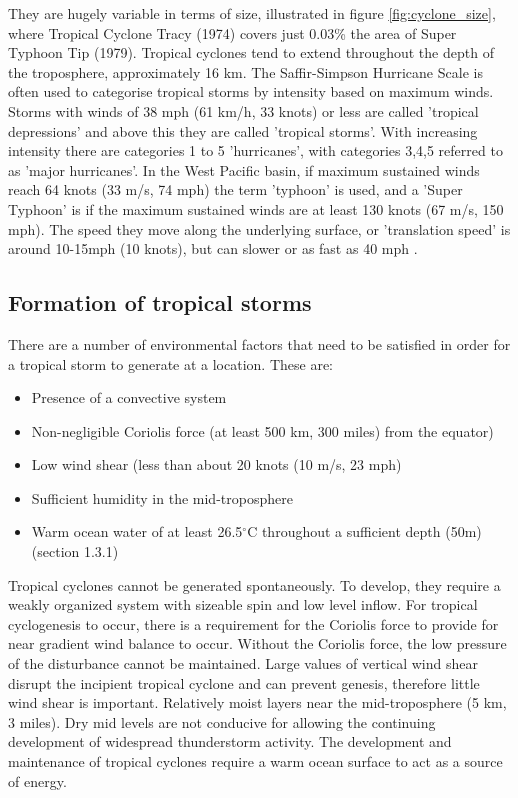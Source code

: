 They are hugely variable in terms of size, illustrated in figure \ref{fig:cyclone_size}, where Tropical Cyclone Tracy (1974) covers just 0.03\% the area of Super Typhoon Tip (1979). Tropical cyclones tend to extend throughout the depth of the troposphere, approximately 16 km. The Saffir-Simpson Hurricane Scale \citep{simpson1974hurricane} is often used to categorise tropical storms by intensity based on maximum winds. Storms with winds of 38 mph (61 km/h, 33 knots) or less are called 'tropical depressions' and above this they are called 'tropical storms'. With increasing intensity there are categories 1 to 5 'hurricanes', with categories 3,4,5 referred to as 'major hurricanes'. In the West Pacific basin, if maximum sustained winds reach 64 knots (33 m/s, 74 mph) the term 'typhoon' is used, and a 'Super Typhoon' is if the maximum sustained winds are at least 130 knots (67 m/s, 150 mph).
The speed they move along the underlying surface, or 'translation speed' is around 10-15mph (10 knots), but can slower or as fast as 40 mph \citep{mo_tc}.  


\subsection{Formation of tropical storms}

There are a number of environmental factors that need to be satisfied in order for a tropical storm to generate at a location. These are:
\begin{itemize}
	\item Presence of a convective system
	\item Non-negligible Coriolis force (at least 500 km, 300 miles) from the equator) \citep{noaaA15}
	\item Low wind shear (less than about 20 knots (10 m/s, 23 mph) \citep{noaaA15} 
	\item Sufficient humidity in the mid-troposphere
	\item Warm ocean water of at least 26.5$^{\circ}$C throughout a sufficient depth (50m) (section 1.3.1)
	
\end{itemize}

Tropical cyclones cannot be generated spontaneously. To develop, they require a weakly organized system with sizeable spin and low level inflow. For tropical cyclogenesis to occur, there is a requirement for the Coriolis force to provide for near gradient wind balance to occur. Without the Coriolis force, the low pressure of the disturbance cannot be maintained. Large values of vertical wind shear disrupt the incipient tropical cyclone and can prevent genesis, therefore little wind shear is important. Relatively moist layers near the mid-troposphere (5 km, 3 miles). Dry mid levels are not conducive for allowing the continuing development of widespread thunderstorm activity. The development and maintenance of tropical cyclones require a warm ocean surface to act as a source of energy.

